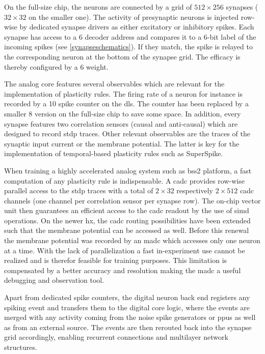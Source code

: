 On the full-size chip, the neurons are connected by a grid of $512 \times 256$ synapses ($32 \times 32$ on the smaller one). The activity of presynaptic neurons is injected row-wise by dedicated synapse drivers as either excitatory or inhibitory spikes. Each synapse has access to a \SI{6}{\bit} decoder address and compares it to a 6-bit label of the incoming spikes (see \cref{synapseschematics}). If they match, the spike is relayed to the corresponding neuron at the bottom of the synapse grid. The efficacy is thereby configured by a \SI{6}{\bit} weight.

The analog core features several observables which are relevant for the implementation of plasticity rules. The firing rate of a neuron for instance is recorded by a \SI{10}{\bit} spike counter on the \gls{dls}. The counter has been replaced by a smaller \SI{8}{\bit} version on the full-size chip to save some space. In addition, every synapse features two correlation sensors (causal and anti-causal) which are designed to record \gls{stdp} traces. Other relevant observables are the traces of the synaptic input current or the membrane potential. The latter is key for the implementation of temporal-based plasticity rules such as SuperSpike.

When training a highly accelerated analog system such as \gls{bss2} platform, a fast computation of any plasticity rule is indispensable. A \gls{cadc} provides row-wise parallel access to the \gls{stdp} traces with a total of $2 \times 32$ respectively $2 \times 512$ \gls{cadc} channels (one channel per correlation sensor per synapse row). The on-chip vector unit then guarantees an efficient access to the \gls{cadc} readout by the use of \gls{simd} operations. On the newer \gls{hx}, the \gls{cadc} routing possibilities have been extended such that the membrane potential can be accessed as well. Before this renewal the membrane potential was recorded by an \gls{madc} which accesses only one neuron at a time. With the lack of parallelization a fast in-experiment use cannot be realized and is therefor feasible for training purposes. This limitation is compensated by a better accuracy and resolution making the \gls{madc} a useful debugging and observation tool.

Apart from dedicated spike counters, the digital neuron back end registers any spiking event and transfers them to the digital core logic, where the events are merged with any activity coming from the noise spike generators or \glspl{ppu} as well as from an external source. The events are then rerouted back into the synapse grid accordingly, enabling recurrent connections and multilayer network structures.

